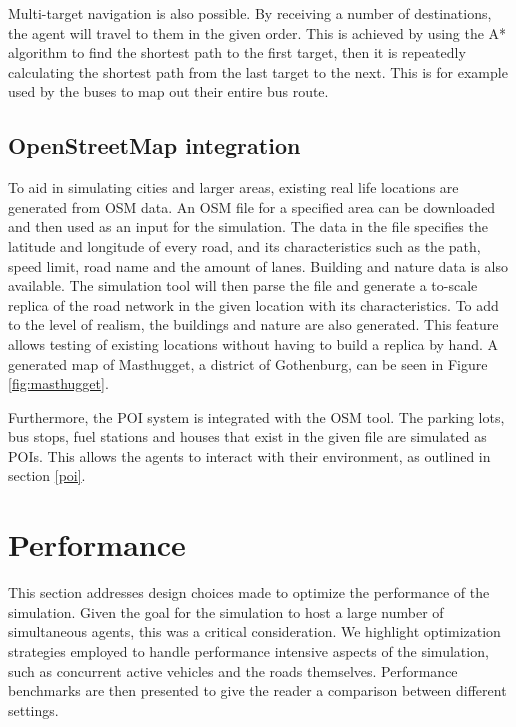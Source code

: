         Multi-target navigation is also possible. By receiving a number of destinations, the agent will travel to them in the given order. This is achieved by using the A* algorithm to find the shortest path to the first target, then it is repeatedly calculating the shortest path from the last target to the next. This is for example used by the buses to map out their entire bus route.
        
    \subsection{OpenStreetMap integration}
        To aid in simulating cities and larger areas, existing real life locations are generated from OSM data. An OSM file for a specified area can be downloaded and then used as an input for the simulation. The data in the file specifies the latitude and longitude of every road, and its characteristics such as the path, speed limit, road name and the amount of lanes. Building and nature data is also available. The simulation tool will then parse the file and generate a to-scale replica of the road network in the given location with its characteristics. To add to the level of realism, the buildings and nature are also generated. This feature allows testing of existing locations without having to build a replica by hand. A generated map of Masthugget, a district of Gothenburg, can be seen in Figure \ref{fig:masthugget}.

        Furthermore, the POI system is integrated with the OSM tool. The parking lots, bus stops, fuel stations and houses that exist in the given file are simulated as POIs. This allows the agents to interact with their environment, as outlined in section \ref{poi}.


\section{Performance}
    This section addresses design choices made to optimize the performance of the simulation. Given the goal for the simulation to host a large number of simultaneous agents, this was a critical consideration. We highlight optimization strategies employed to handle performance intensive aspects of the simulation, such as concurrent active vehicles and the roads themselves. Performance benchmarks are then presented to give the reader a comparison between different settings.


